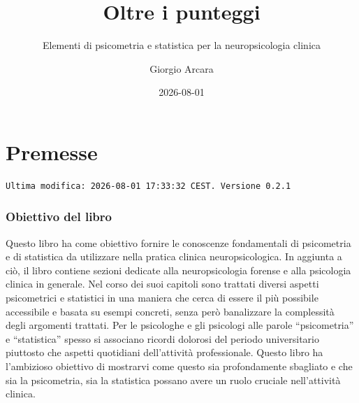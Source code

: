 \documentclass[
  italian,
  letterpaper,
  paper=A4,
  headinclude=on,
  footinclude=on,
  12pt]{scrbook}
\title{Oltre i punteggi}
\subtitle{Elementi di psicometria e statistica per la neuropsicologia
clinica}
\author{Giorgio Arcara}
\date{2026-08-01}
\renewcommand{\maketitle}{}
\renewcommand*\contentsname{Indice}
\newcommand\contentsname{Indice}
\begin{document}
\frontmatter
\maketitle



\renewcommand*\contentsname{Indice}
{
\setcounter{tocdepth}{2}
\tableofcontents
}

\mainmatter
{}

\chapter*{Premesse}\label{premesse}


\begin{verbatim}
Ultima modifica: 2026-08-01 17:33:32 CEST. Versione 0.2.1
\end{verbatim}

\subsection*{Obiettivo del libro}\label{obiettivo-del-libro}

Questo libro ha come obiettivo fornire le conoscenze fondamentali di
psicometria e di statistica da utilizzare nella pratica clinica
neuropsicologica. In aggiunta a ciò, il libro contiene sezioni dedicate
alla neuropsicologia forense e alla psicologia clinica in generale. Nel
corso dei suoi capitoli sono trattati diversi aspetti psicometrici e
statistici in una maniera che cerca di essere il più possibile
accessibile e basata su esempi concreti, senza però banalizzare la
complessità degli argomenti trattati. Per le psicologhe e gli psicologi
alle parole ``psicometria'' e ``statistica'' spesso si associano ricordi
dolorosi del periodo universitario piuttosto che aspetti quotidiani
dell'attività professionale. Questo libro ha l'ambizioso obiettivo di
mostrarvi come questo sia profondamente sbagliato e che sia la
psicometria, sia la statistica possano avere un ruolo cruciale
nell'attività clinica.
\end{document}
